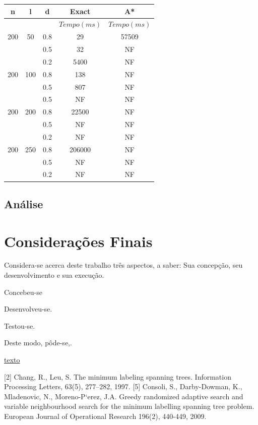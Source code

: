 \documentclass[12pt]{article}
\begin{document}
		\vspace{2cm}

		\begin{tabular}{c|c|c|c|c} \hline
			n & l & d & Exact & A* \\ \hline
			& & & $Tempo(ms)$ & $Tempo(ms)$\\ \hline
			200 & 50  & 0.8 & 29 & 57509\\
			   &      & 0.5 & 32 & NF\\
			   &      & 0.2 & 5400 & NF\\ \hline
			200 & 100  & 0.8 & 138 & NF \\
			   &      & 0.5 & 807 & NF\\
			   &      & 0.5 & NF & NF\\ \hline
			200 & 200 & 0.8 &  22500 & NF\\
			   &      & 0.5 & NF & NF\\
			   &      & 0.2 & NF & NF\\ \hline
			200 & 250 & 0.8 & 206000 & NF\\
			   &      & 0.5 & NF & NF\\
			   &      & 0.2 & NF & NF\\ \hline
		\end{tabular}

	\subsection{Análise}\label{sec:analise}

\section{Considerações Finais}\label{sec:conclusao}
	
	Considera-se acerca deste trabalho três aspectos, a saber: Sua concepção, seu desenvolvimento e sua execução.

	Concebeu-se

	Desenvolveu-se.

	Testou-se.

	Deste modo, pôde-se,.




\href{https://www.ime.usp.br/~cris/aulas/12_1_6711/slides/aula13.pdf}{texto}

[2] Chang, R., Leu, S. The minimum labeling spanning trees. Information Processing Letters, 63(5), 277–282, 1997.
[5] Consoli, S., Darby-Dowman, K., Mladenovic, N., Moreno-P`erez, J.A. Greedy randomized adaptive search and variable neighbourhood search for the minimum labelling spanning tree problem. European Journal of Operational Research 196(2), 440-449, 2009.
\end{document}
